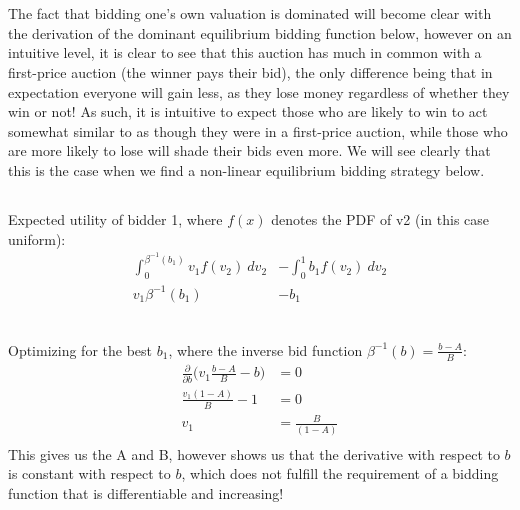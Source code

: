 \documentclass[a4paper,12pt]{article}
\begin{document}
\section{}
\subsection{}
The fact that bidding one's own valuation is dominated will become clear with the derivation of the dominant equilibrium bidding function below, however on an intuitive level, it is clear to see that this auction has much in common with a first-price auction (the winner pays their bid), the only difference being that in expectation everyone will gain less, as they lose money regardless of whether they win or not! As such, it is intuitive to expect those who are likely to win to act somewhat similar to as though they were in a first-price auction, while those who are more likely to lose will shade their bids even more. We will see clearly that this is the case when we find a non-linear equilibrium bidding strategy below. 
%
\subsection{}
Expected utility of bidder 1, where $f(x)$ denotes the PDF of v2 (in this case uniform):
\begin{align*}
\int_{0}^{\beta^{-1}(b_1)} v_1 f(v_2) \ dv_2 &- \int_{0}^{1} b_1 f(v_2) \ dv_2 \\
v_1 \beta^{-1}(b_1) &-  b_1 \\
\end{align*}

\subsection{}
Optimizing for the best $b_1$, where the inverse bid function $\beta^{-1}(b) = \frac{b - A}{B}$:
%
\begin{align*}
\frac{\partial}{\partial b} \bigg(v_1 \frac{b - A}{B} - b \bigg) &= 0 \\
\frac{v_1(1 - A)}{B} - 1 &= 0 \\
v_1 &= \frac{B}{(1 - A)} \\
\end{align*} 
%
This gives us the A and B, however shows us that the derivative with respect to $b$ is constant with respect to $b$, which does not fulfill the requirement of a bidding function that is differentiable and increasing!
\end{document}
